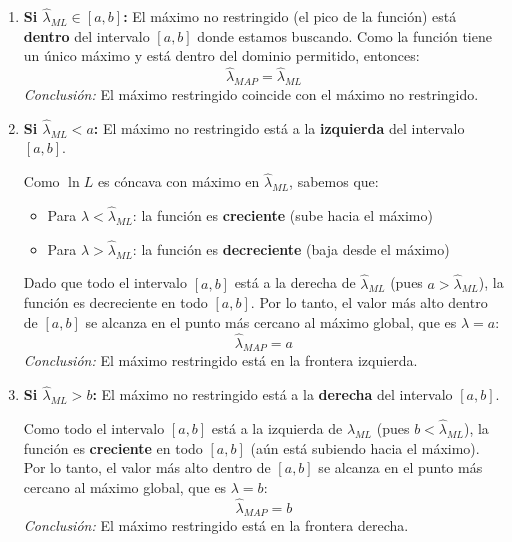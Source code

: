 \documentclass[
  11pt,
  letterpaper,
   addpoints,
   answers
  ]{exam}
\begin{document}
\begin{questions}
\begin{parts}
\begin{solution}
\begin{enumerate}
\item \textbf{Si $\hat{\lambda}_{ML} \in [a,b]$:} El máximo no restringido (el pico de la función) está \textbf{dentro} del intervalo $[a,b]$ donde estamos buscando. Como la función tiene un único máximo y está dentro del dominio permitido, entonces:
\begin{equation}
\hat{\lambda}_{MAP} = \hat{\lambda}_{ML}
\end{equation}
\textit{Conclusión:} El máximo restringido coincide con el máximo no restringido.

\item \textbf{Si $\hat{\lambda}_{ML} < a$:} El máximo no restringido está a la \textbf{izquierda} del intervalo $[a,b]$. 

Como $\ln L$ es cóncava con máximo en $\hat{\lambda}_{ML}$, sabemos que:
\begin{itemize}
\item Para $\lambda < \hat{\lambda}_{ML}$: la función es \textbf{creciente} (sube hacia el máximo)
\item Para $\lambda > \hat{\lambda}_{ML}$: la función es \textbf{decreciente} (baja desde el máximo)
\end{itemize}

Dado que todo el intervalo $[a,b]$ está a la derecha de $\hat{\lambda}_{ML}$ (pues $a > \hat{\lambda}_{ML}$), la función es decreciente en todo $[a,b]$. Por lo tanto, el valor más alto dentro de $[a,b]$ se alcanza en el punto más cercano al máximo global, que es $\lambda = a$:
\begin{equation}
\hat{\lambda}_{MAP} = a
\end{equation}
\textit{Conclusión:} El máximo restringido está en la frontera izquierda.

\item \textbf{Si $\hat{\lambda}_{ML} > b$:} El máximo no restringido está a la \textbf{derecha} del intervalo $[a,b]$.

Como todo el intervalo $[a,b]$ está a la izquierda de $\hat{\lambda}_{ML}$ (pues $b < \hat{\lambda}_{ML}$), la función es \textbf{creciente} en todo $[a,b]$ (aún está subiendo hacia el máximo). Por lo tanto, el valor más alto dentro de $[a,b]$ se alcanza en el punto más cercano al máximo global, que es $\lambda = b$:
\begin{equation}
\hat{\lambda}_{MAP} = b
\end{equation}
\textit{Conclusión:} El máximo restringido está en la frontera derecha.
\end{enumerate}


\end{solution}
\end{parts}
\end{questions}
\end{document}
